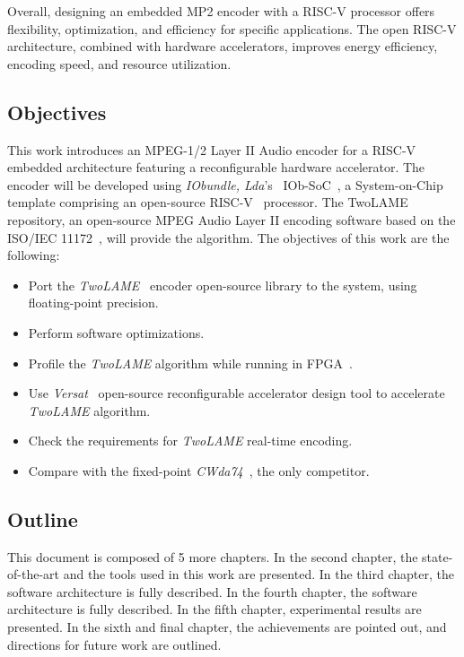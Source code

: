Overall, designing an embedded MP2 encoder with a RISC-V processor offers flexibility, optimization, and efficiency for specific applications. The open RISC-V architecture, combined with hardware accelerators, improves energy efficiency, encoding speed, and resource utilization.

\subsection{Objectives}

This work introduces an MPEG-1/2 Layer II Audio encoder for a RISC-V embedded architecture
featuring a reconfigurable hardware accelerator. The encoder will be developed using \textit{IObundle, Lda}'s~\cite{iobundle} IOb-SoC~\cite{bib:iobsoc-github}, a System-on-Chip template comprising an open-source RISC-V~\cite{riscv} processor. The TwoLAME~\cite{twolamerepo} repository, an open-source MPEG Audio Layer II encoding software based on the ISO/IEC 11172~\cite{11172}, will provide the algorithm.
The objectives of this work are the following:

\begin{itemize}
    \item Port the \textit{TwoLAME}~\cite{bib:twolame} encoder open-source library to the system, using floating-point precision.
    \item Perform software optimizations.
    \item Profile the \textit{TwoLAME} algorithm while running in FPGA~\cite{fpga}.
    \item Use \textit{Versat}~\cite{bib:iobversat} open-source reconfigurable accelerator design tool to accelerate \textit{TwoLAME} algorithm.
    \item Check the requirements for \textit{TwoLAME} real-time encoding.
    \item Compare with the fixed-point \textit{CWda74}~\cite{CWda74}, the only competitor.
\end{itemize}

\subsection{Outline}

This document is composed of 5 more chapters. In the second chapter, the state-of-the-art and the tools used in this work are presented. In the third chapter, the software architecture is fully described. In the fourth chapter, the software architecture is fully described. In the fifth chapter, experimental results are presented. In the sixth and final chapter, the achievements are pointed out, and directions for future work are outlined.





